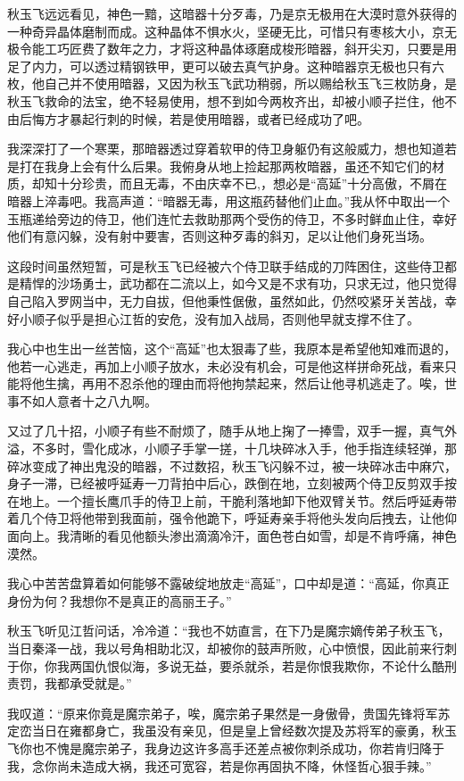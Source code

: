 秋玉飞远远看见，神色一黯，这暗器十分歹毒，乃是京无极用在大漠时意外获得的一种奇异晶体磨制而成。这种晶体不惧水火，坚硬无比，可惜只有枣核大小，京无极令能工巧匠费了数年之力，才将这种晶体琢磨成梭形暗器，斜开尖刃，只要是用足了内力，可以透过精钢铁甲，更可以破去真气护身。这种暗器京无极也只有六枚，他自己并不使用暗器，又因为秋玉飞武功稍弱，所以赐给秋玉飞三枚防身，是秋玉飞救命的法宝，绝不轻易使用，想不到如今两枚齐出，却被小顺子拦住，他不由后悔方才暴起行刺的时候，若是使用暗器，或者已经成功了吧。

我深深打了一个寒栗，那暗器透过穿着软甲的侍卫身躯仍有这般威力，想也知道若是打在我身上会有什么后果。我俯身从地上捡起那两枚暗器，虽还不知它们的材质，却知十分珍贵，而且无毒，不由庆幸不已,，想必是“高延”十分高傲，不屑在暗器上淬毒吧。我高声道：“暗器无毒，用这瓶药替他们止血。”我从怀中取出一个玉瓶递给旁边的侍卫，他们连忙去救助那两个受伤的侍卫，不多时鲜血止住，幸好他们有意闪躲，没有射中要害，否则这种歹毒的斜刃，足以让他们身死当场。

这段时间虽然短暂，可是秋玉飞已经被六个侍卫联手结成的刀阵困住，这些侍卫都是精悍的沙场勇士，武功都在二流以上，如今又是不求有功，只求无过，他只觉得自己陷入罗网当中，无力自拔，但他秉性倨傲，虽然如此，仍然咬紧牙关苦战，幸好小顺子似乎是担心江哲的安危，没有加入战局，否则他早就支撑不住了。

我心中也生出一丝苦恼，这个“高延”也太狠毒了些，我原本是希望他知难而退的，他若一心逃走，再加上小顺子放水，未必没有机会，可是他这样拼命死战，看来只能将他生擒，再用不忍杀他的理由而将他拘禁起来，然后让他寻机逃走了。唉，世事不如人意者十之八九啊。

又过了几十招，小顺子有些不耐烦了，随手从地上掬了一捧雪，双手一握，真气外溢，不多时，雪化成冰，小顺子手掌一搓，十几块碎冰入手，他手指连续轻弹，那碎冰变成了神出鬼没的暗器，不过数招，秋玉飞闪躲不过，被一块碎冰击中麻穴，身子一滞，已经被呼延寿一刀背拍中后心，跌倒在地，立刻被两个侍卫反剪双手按在地上。一个擅长鹰爪手的侍卫上前，干脆利落地卸下他双臂关节。然后呼延寿带着几个侍卫将他带到我面前，强令他跪下，呼延寿亲手将他头发向后拽去，让他仰面向上。我清晰的看见他额头渗出滴滴冷汗，面色苍白如雪，却是不肯呼痛，神色漠然。

我心中苦苦盘算着如何能够不露破绽地放走“高延”，口中却是道：“高延，你真正身份为何？我想你不是真正的高丽王子。”

秋玉飞听见江哲问话，冷冷道：“我也不妨直言，在下乃是魔宗嫡传弟子秋玉飞，当日秦泽一战，我以号角相助北汉，却被你的鼓声所败，心中愤恨，因此前来行刺于你，你我两国仇恨似海，多说无益，要杀就杀，若是你恨我欺你，不论什么酷刑责罚，我都承受就是。”

我叹道：“原来你竟是魔宗弟子，唉，魔宗弟子果然是一身傲骨，贵国先锋将军苏定峦当日在雍都身亡，我虽没有亲见，但是皇上曾经数次提及苏将军的豪勇，秋玉飞你也不愧是魔宗弟子，我身边这许多高手还差点被你刺杀成功，你若肯归降于我，念你尚未造成大祸，我还可宽容，若是你再固执不降，休怪哲心狠手辣。”

